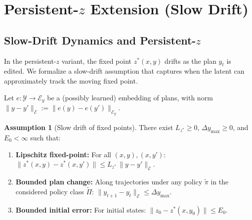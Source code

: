 \documentclass{article}
\theoremstyle{plain}
\theoremstyle{definition}
\newtheorem{assumption}[theorem]{Assumption}
\theoremstyle{remark}
\newcommand{\YY}{\mathcal{Y}}
\begin{document}
\section{Persistent-$z$ Extension (Slow Drift)}
\label{app:persistent_latent}

\subsection{Slow-Drift Dynamics and Persistent-$z$}
\label{sec:twotimescale_persistent}

In the persistent-$z$ variant, the fixed point $z^*(x,y)$ drifts as the plan $y_t$ is edited.
We formalize a slow-drift assumption that captures when the latent can approximately track the moving fixed point.

Let $e:\YY\to\mathcal{E}_y$ be a (possibly learned) embedding of plans, with norm $\|y-y'\|_{\mathcal{E}} := \|e(y)-e(y')\|_{\mathcal{E}_y}$.

\begin{assumption}[Slow drift of fixed points]
\label{ass:twotimescale}
There exist $L_{z^*} \ge 0$, $\Delta y_{\max} \ge 0$, and $E_0 < \infty$ such that:
\begin{enumerate}
\item \textbf{Lipschitz fixed-point:} For all $(x,y),(x,y')$:
$\bigl\|z^*(x,y) - z^*(x,y')\bigr\| \le L_{z^*}\,\|y-y'\|_{\mathcal{E}}$.
\item \textbf{Bounded plan change:} Along trajectories under any policy $\tilde{\pi}$ in the considered policy class $\tilde{\Pi}$:
$\|y_{t+1}-y_t\|_{\mathcal{E}} \le \Delta y_{\max}$.
\item \textbf{Bounded initial error:} For initial states: $\bigl\|z_0 - z^*(x,y_0)\bigr\|\le E_0$.
\end{enumerate}
\end{assumption}
\end{document}

